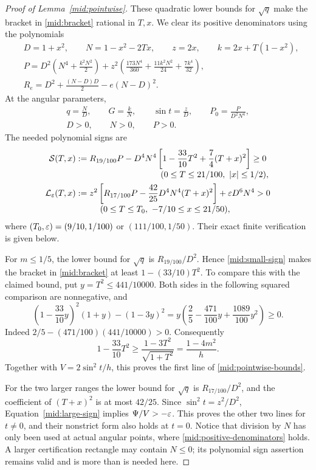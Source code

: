 \begin{proof}[Proof of Lemma~\ref{mid:pointwise}]
These quadratic lower bounds for \(\sqrt q\) make the bracket in
\eqref{mid:bracket} rational in \(T,x\). We clear its positive
denominators using the polynomials
\begin{align}
 &D=1+x^2,\qquad N=1-x^2-2Tx,\qquad
 z=2x,\qquad k=2x+T(1-x^2),
 \label{mid:polynomial-variables}\\
 &P=D^2\left(N^4+\frac{k^2N^2}{2}\right)
 +z^2\left(\frac{173N^4}{360}+\frac{11k^2N^2}{24}
                              +\frac{7k^4}{32}\right),
 \label{mid:P}\\
 &R_e=D^2+\frac{(N-D)D}{2}-e(N-D)^2.
 \label{mid:R}
\end{align}
At the angular parameters,
\begin{equation}\label{mid:positive-denominators}
 \begin{gathered}
 q=\frac ND,\qquad G=\frac kN,\qquad
 \sin t=\frac zD,\qquad P_0=\frac{P}{D^2N^4},\\
 D>0,\qquad N>0,\qquad P>0.
 \end{gathered}
\end{equation}
The needed polynomial signs are
\begin{align}
 \mathcal S(T,x)
 &:=R_{19/100}P-D^4N^4
       \left[1-\frac{33}{10}T^2+\frac74(T+x)^2\right]\ge0
 \label{mid:small-sign}\\[-3pt]
 &\hspace{35mm}(0\le T\le21/100,\ |x|\le1/2),\notag\\
 \mathcal L_{\eps}(T,x)
 &:=z^2\left[R_{17/100}P-\frac{42}{25}D^4N^4(T+x)^2\right]
       +\eps D^6N^4>0
 \label{mid:large-sign}\\[-3pt]
 &\hspace{10mm}(0\le T\le T_0,\ -7/10\le x\le21/50),\notag
\end{align}
where \((T_0,\varepsilon)=(9/10,1/100)\) or \((111/100,1/50)\).
Their exact finite verification is given below.

For \(m\le1/5\), the lower bound for \(\sqrt q\) is
\(R_{19/100}/D^2\). Hence
\eqref{mid:small-sign} makes the bracket in \eqref{mid:bracket}
at least \(1-(33/10)T^2\).
To compare this with the claimed bound, put \(y=T^2\le441/10000\).
Both sides in the following squared comparison are nonnegative, and
\[
 \left(1-\frac{33}{10}y\right)^2(1+y)-(1-3y)^2
 =y\left(\frac25-\frac{471}{100}y+\frac{1089}{100}y^2\right)\ge0.
\]
Indeed \(2/5-(471/100)(441/10000)>0\). Consequently
\[
 1-\frac{33}{10}T^2
 \ge\frac{1-3T^2}{\sqrt{1+T^2}}
 =\frac{1-4m^2}{h}.
\]
Together with \(V=2\sin^2t/h\), this proves the first line of
\eqref{mid:pointwise-bounds}.

For the two larger ranges the lower bound for \(\sqrt q\) is
\(R_{17/100}/D^2\), and the coefficient of \((T+x)^2\) is at most
\(42/25\).
Since \(\sin^2t=z^2/D^2\), Equation~\eqref{mid:large-sign}
implies \(\Psi/V>-\varepsilon\). This proves the other two lines for
\(t\ne0\), and their nonstrict form also holds at \(t=0\).
Notice that division by \(N\) has only been used at actual angular
points, where \eqref{mid:positive-denominators} holds. A larger
certification rectangle may contain \(N\le0\); its polynomial sign
assertion remains valid and is more than is needed here.
\end{proof}

